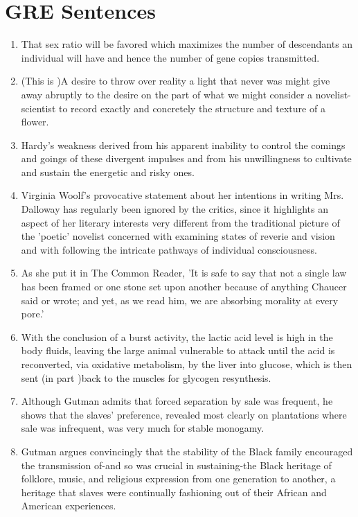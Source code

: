 \chapter{GRE Sentences}

\begin{enumerate}
\item That sex ratio will be favored which maximizes the number of  descendants an individual will have and hence the number of gene copies transmitted. 

\item (This is )A desire to throw over reality a light that never was might give away abruptly to the desire on the part of what we might consider a novelist-scientist to record exactly and concretely the structure and texture of a flower.

\item Hardy's weakness derived from his apparent inability to control the comings and goings of these divergent impulses and from his unwillingness to cultivate and sustain the energetic and risky ones. 

\item Virginia Woolf's provocative statement about her intentions in writing Mrs. Dalloway has regularly been ignored by the critics, since it highlights an aspect of her literary interests very different from the traditional picture of the 'poetic'  novelist concerned with examining states  of reverie and vision and with following the intricate pathways of individual consciousness.

\item As she put it in The Common Reader, 'It is safe to say that not a single law has been framed or one stone set upon another because of anything Chaucer said or wrote; and yet, as we read him, we are absorbing morality at every pore.'

\item With the conclusion of a burst activity, the lactic acid level is high in the body fluids, leaving the large animal vulnerable to attack until the acid is reconverted, via oxidative metabolism, by the liver into glucose, which is then sent (in part )back to the muscles for glycogen resynthesis.

\item Although Gutman admits that forced separation by sale was frequent, he shows that the slaves' preference, revealed most clearly on plantations where sale was infrequent, was very much for stable monogamy.

\item Gutman argues convincingly that the stability of the Black family encouraged the transmission of-and so was crucial in sustaining-the Black heritage of folklore, music, and religious expression from one generation to another, a heritage that slaves were continually fashioning out of their African and American experiences.


\end{enumerate}
